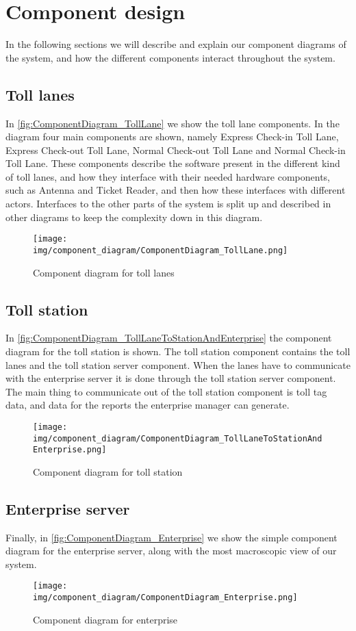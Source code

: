 \section*{Component design}
In the following sections we will describe and explain our component diagrams of the system, and how the different components interact throughout the system.
\subsection*{Toll lanes}
In \autoref{fig:ComponentDiagram_TollLane} we show the toll lane components. In the diagram four main components are shown, namely Express Check-in Toll Lane, Express Check-out Toll Lane, Normal Check-out Toll Lane and Normal Check-in Toll Lane. These components describe the software present in the different kind of toll lanes, and how they interface with their needed hardware components, such as Antenna and Ticket Reader, and then how these interfaces with different actors. Interfaces to the other parts of the system is split up and described in other diagrams to keep the complexity down in this diagram.
\begin{figure}
\centering
\texttt{[image: img/component\_diagram/ComponentDiagram\_TollLane.png]}
\caption{Component diagram for toll lanes}
\label{fig:ComponentDiagram_TollLane}
\end{figure}

\subsection*{Toll station}
In \autoref{fig:ComponentDiagram_TollLaneToStationAndEnterprise} the component diagram for the toll station is shown. The toll station component contains the toll lanes and the toll station server component. When the lanes have to communicate with the enterprise server it is done through the toll station server component. The main thing to communicate out of the toll station component is toll tag data, and data for the reports the enterprise manager can generate.
\begin{figure}
\centering
\texttt{[image: img/component\_diagram/ComponentDiagram\_TollLaneToStationAndEnterprise.png]}
\caption{Component diagram for toll station}
\label{fig:ComponentDiagram_TollLaneToStationAndEnterprise}
\end{figure}

\subsection*{Enterprise server}
Finally, in \autoref{fig:ComponentDiagram_Enterprise} we show the simple component diagram for the enterprise server, along with the most macroscopic view of our system. 
\begin{figure}
\centering
\texttt{[image: img/component\_diagram/ComponentDiagram\_Enterprise.png]}
\caption{Component diagram for enterprise}
\label{fig:ComponentDiagram_Enterprise}
\end{figure}
